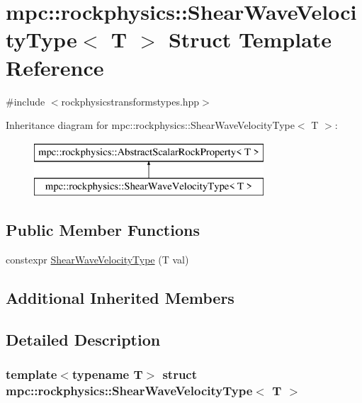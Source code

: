 \hypertarget{structmpc_1_1rockphysics_1_1_shear_wave_velocity_type}{}\section{mpc\+:\+:rockphysics\+:\+:Shear\+Wave\+Velocity\+Type$<$ T $>$ Struct Template Reference}
\label{structmpc_1_1rockphysics_1_1_shear_wave_velocity_type}


{\ttfamily \#include $<$rockphysicstransformstypes.\+hpp$>$}

Inheritance diagram for mpc\+:\+:rockphysics\+:\+:Shear\+Wave\+Velocity\+Type$<$ T $>$\+:\begin{figure}[H]
\begin{center}
\leavevmode
\includegraphics[height=2.000000cm]{structmpc_1_1rockphysics_1_1_shear_wave_velocity_type}
\end{center}
\end{figure}
\subsection*{Public Member Functions}
\begin{DoxyCompactItemize}
\item 
constexpr \mbox{\hyperlink{structmpc_1_1rockphysics_1_1_shear_wave_velocity_type_a33df4d42ef80ac6bbe7208a90df17a94}{Shear\+Wave\+Velocity\+Type}} (T val)
\end{DoxyCompactItemize}
\subsection*{Additional Inherited Members}


\subsection{Detailed Description}
\subsubsection*{template$<$typename T$>$\newline
struct mpc\+::rockphysics\+::\+Shear\+Wave\+Velocity\+Type$<$ T $>$}



